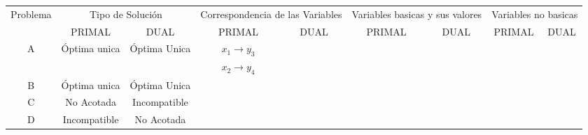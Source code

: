     \begin{tabular}{c|cc|cc|cc|cc}
    \hline
    \hline
    Problema & \multicolumn{2}{c|}{Tipo de Solución } & \multicolumn{2}{c|}{Correspondencia de las Variables} & \multicolumn{2}{c|}{Variables basicas  y sus valores} & \multicolumn{2}{c}{Variables no basicas} \bigstrut[t]\\
            & PRIMAL  & DUAL    & PRIMAL  & DUAL    & PRIMAL  & DUAL    & PRIMAL  & DUAL \bigstrut[b]\\
    \hline
    \hline
    \multirow{2}[2]{*}{A} & \multirow{2}[2]{*}{Óptima unica} & \multirow{2}[2]{*}{Óptima Unica} & $x_1 \rightarrow y_3$ &         &         &         &         &  \bigstrut[t]\\
            &         &         &   $x_2 \rightarrow y_4$ &         &         &         &         &  \bigstrut[b]\\
    \hline
    \multirow{3}[2]{*}{B} & \multirow{3}[2]{*}{Óptima unica} & \multirow{3}[2]{*}{Óptima Unica} &         &         &         &         &         &  \bigstrut[t]\\
            &         &         &         &         &         &         &         &  \\
            &         &         &         &         &         &         &         &  \bigstrut[b]\\
    \hline
    \multirow{2}[2]{*}{C} & \multirow{2}[2]{*}{No Acotada} & \multirow{2}[2]{*}{Incompatible} &         &         &         &         &         &  \bigstrut[t]\\
            &         &         &         &         &         &         &         &  \bigstrut[b]\\
    \hline
    \multirow{2}[2]{*}{D} & \multirow{2}[2]{*}{Incompatible} & \multirow{2}[2]{*}{No Acotada} &         &         &         &         &         &  \bigstrut[t]\\
            &         &         &         &         &         &         &         &  \bigstrut[b]\\
    \hline
    \hline
    \end{tabular}%

